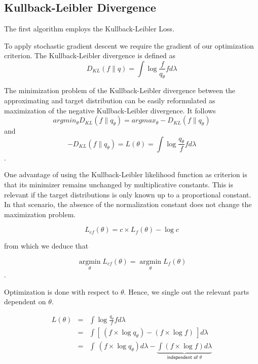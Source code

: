\subsection{Kullback-Leibler Divergence}


The first algorithm employs the Kullback-Leibler Loss. 

To apply stochastic gradient descent we require the gradient of our optimization criterion. The Kullback-Leibler divergence is defined as
$$D_{KL}(f\|q) = \displaystyle \int \log \frac{f}{q_{\theta}} f d\lambda$$

The minimization problem of the Kullback-Leibler divergence between the approximating and target distribution can be easily reformulated as maximization of the negative Kullback-Leibler divergence. It follows 
$$argmin_\theta D_{KL}(f\|q_{\theta}) = argmax_\theta -D_{KL}(f\|q_{\theta}) $$
and 
$$ -D_{KL}(f\|q_{\theta}) = L(\theta) = \displaystyle \int \log \frac{q_\theta}{f} f d \lambda$$.

\bigskip
One advantage of using the Kullback-Leibler likelihood function as criterion is that its minimizer remains unchanged by multiplicative constants. This is relevant if the target distributions is only known up to a proportional constant. In that scenario, the absence of the normalization constant does not change the maximization problem.

$$L_{c f}(\theta) = c \times L_f(\theta) - \log c$$

from which we deduce that 

$$\operatorname{argmin}\limits_\theta L_{cf}(\theta) = \operatorname{argmin}\limits_\theta L_{f}(\theta)$$.

\bigskip

Optimization is done with respect to $\theta$. Hence, we single out the relevant parts dependent on $\theta$. 

$$
\begin{array}{lcl}
L(\theta) &=& \displaystyle \int \log \frac{q_\theta}{f} f d \lambda
\\
&=& \displaystyle\int\left[ \ \left(f \times \log q_\theta\right) - \left( f \times \log f \right) \ \right] d\lambda
\\
&=& \displaystyle\int \ \left(f \times \log q_\theta\right) d\lambda - \underbrace{\displaystyle\int \left( f \times \log f \right) d\lambda}_{\textsf{independent of } \theta}
\end{array}
$$

\bigskip

